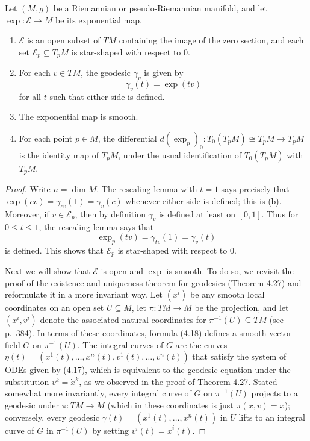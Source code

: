 \begin{proposition}
\label{prop:exponential-map-properties}

Let $(M, g)$ be a Riemannian or pseudo-Riemannian manifold, and let $\exp: \mathcal{E} \to M$ be its exponential map.
\begin{enumerate}[label=(\alph*)]
\item $\mathcal{E}$ is an open subset of $TM$ containing the image of the zero section, and each set $\mathcal{E}_p \subseteq T_p M$ is star-shaped with respect to $0$.
\item For each $v \in TM$, the geodesic $\gamma_v$ is given by
\begin{equation}
\gamma_v(t) = \exp(tv) \tag{5.17}
\end{equation}
for all $t$ such that either side is defined.
\item The exponential map is smooth.
\item For each point $p \in M$, the differential $d(\exp_p)_0 : T_0(T_p M) \cong T_p M \to T_p M$ is the identity map of $T_p M$, under the usual identification of $T_0(T_p M)$ with $T_p M$.
\end{enumerate}

\begin{proof}
Write $n = \dim M$. The rescaling lemma with $t = 1$ says precisely that $\exp(cv) = \gamma_{cv}(1) = \gamma_v(c)$ whenever either side is defined; this is (b). Moreover, if $v \in \mathcal{E}_p$, then by definition $\gamma_v$ is defined at least on $[0, 1]$. Thus for $0 \le t \le 1$, the rescaling lemma says that
\[
\exp_p(tv) = \gamma_{tv}(1) = \gamma_v(t)
\]
is defined. This shows that $\mathcal{E}_p$ is star-shaped with respect to $0$.

Next we will show that $\mathcal{E}$ is open and $\exp$ is smooth. To do so, we revisit the proof of the existence and uniqueness theorem for geodesics (Theorem 4.27) and reformulate it in a more invariant way. Let $(x^i)$ be any smooth local coordinates on an open set $U \subseteq M$, let $\pi : TM \to M$ be the projection, and let $(x^i, v^i)$ denote the associated natural coordinates for $\pi^{-1}(U) \subseteq TM$ (see p.\ 384). In terms of these coordinates, formula (4.18) defines a smooth vector field $G$ on $\pi^{-1}(U)$. The integral curves of $G$ are the curves $\eta(t) = (x^1(t), \ldots, x^n(t), v^1(t), \ldots, v^n(t))$ that satisfy the system of ODEs given by (4.17), which is equivalent to the geodesic equation under the substitution $v^k = \dot{x}^k$, as we observed in the proof of Theorem 4.27. Stated somewhat more invariantly, every integral curve of $G$ on $\pi^{-1}(U)$ projects to a geodesic under $\pi : TM \to M$ (which in these coordinates is just $\pi(x, v) = x$); conversely, every geodesic $\gamma(t) = (x^1(t), \ldots, x^n(t))$ in $U$ lifts to an integral curve of $G$ in $\pi^{-1}(U)$ by setting $v^i(t) = \dot{x}^i(t)$.


\end{proof}
\end{proposition}
